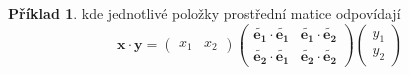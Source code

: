 \documentclass[a5paper,12pt]{amsbook}
\theoremstyle{definition}
\newtheorem{example}{Příklad}[chapter]
\newcommand{\myvec}[1]{\mathbf{#1}}
\begin{document}
\begin{example}
kde jednotlivé položky prostřední matice odpovídají
\begin{equation*}
\myvec{x}\cdot\myvec{y} =
\left(\begin{array}{cc}x_1 & x_2\end{array}\right)
\left(\begin{array}{cc}
  \myvec{\widetilde{e_1}}\cdot\myvec{\widetilde{e_1}} &
  \myvec{\widetilde{e_1}}\cdot\myvec{\widetilde{e_2}} \\
  \myvec{\widetilde{e_2}}\cdot\myvec{\widetilde{e_1}} &
  \myvec{\widetilde{e_2}}\cdot\myvec{\widetilde{e_2}}
\end{array}\right)
\left(\begin{array}{c}y_1 \\ y_2\end{array}\right)
\end{equation*}


\end{example}
\end{document}
